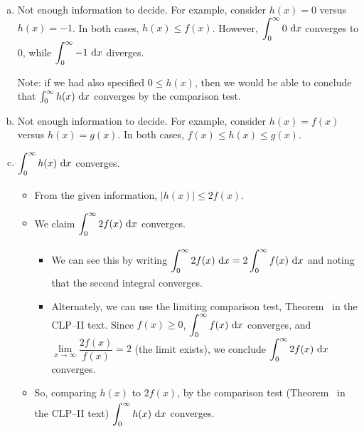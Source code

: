 \begin{solution}
\begin{enumerate}[(a)]
\item Not enough information to decide. For example, consider $h(x) = 0$ versus $h(x) = -1$. In both cases, $h(x) \leq f(x)$. However, $\displaystyle\int_0^\infty 0~\mathrm{d}x$ converges to 0, while $\displaystyle\int_0^\infty -1~\mathrm{d}x$ diverges.

Note: if we had also specified $0 \leq h(x)$, then we would be able to conclude that $ \int_0^\infty h(x)~\mathrm{d}x$ converges by the comparison test.

\item Not enough information to decide. For example, consider $h(x)= f(x)$ versus $h(x) = g(x)$. In both cases, $f(x) \leq h(x) \leq g(x)$.

\item $\displaystyle\int_{0\vphantom{\frac12}}^{\infty}h(x)~\mathrm{d}x$ converges.
\begin{itemize}
\item From the given information, $|h(x)| \leq 2f(x)$.
\item We claim $\displaystyle\int_{0\vphantom{\frac12}}^{\infty} 2f(x)~\mathrm{d}x $ converges.
\begin{itemize}
\item We can see this by writing $\displaystyle\int_{0\vphantom{\frac12}}^{\infty} 2f(x)~\mathrm{d}x= 2\int_0^{\infty} f(x)~\mathrm{d}x $  and noting that the second integral converges. \item Alternately, we can use  the limiting comparison test, Theorem~
 in the CLP--II text. Since $f(x) \geq 0$,  $\displaystyle\int_0^\infty f(x)~\mathrm{d}x$ converges, and $\lim\limits_{x \to \infty}\dfrac{2f(x)}{f(x)}=2$ (the limit exists), we conclude $\displaystyle\int_0^\infty 2f(x)~\mathrm{d}x$ converges.
\end{itemize}
\item So, comparing $h(x)$ to $2f(x)$, by the comparison test (Theorem~ in the CLP--II text)
$\displaystyle\int_0^{\vphantom{\frac12}\infty}h(x)~\mathrm{d}x$ converges.
\end{itemize}
\end{enumerate}

\end{solution}



\subsection*{\Procedural}


